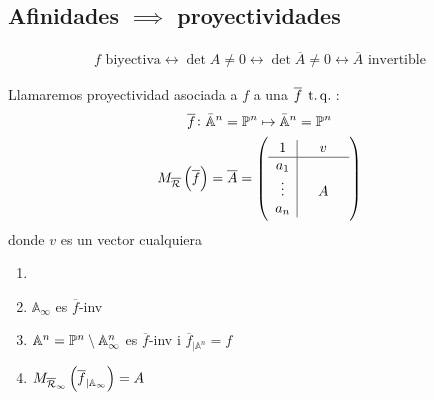\subsection{Afinidades $\implies$ proyectividades}
\begin{gather*}
f\text{ biyectiva} \leftrightarrow \det A \ne 0 \leftrightarrow \det \overline{A} \ne 0 \leftrightarrow \overline{A} \text{ invertible}
\end{gather*}
\begin{defi}
    Llamaremos proyectividad asociada a $f$ a una $\overline{f} \operatorname{\;t.q.\;}$:
    \begin{gather*}
        \overline{f} \colon \bar{\mathbb{A}}^n = \mathbb{P}^n \mapsto \bar{\mathbb{A}}^n = \mathbb{P}^n \\
        M_{\overline{\mathcal{R}}}\left( \overline{f}\right) = \overline{A} = 
        \left(
        \begin{array}{c|ccc}
            1 &  & v & \\ \hline
            a_1 & & & \\
            \vdots & & A & \\
            a_n & & & 
        \end{array} \right) \\ 
    \end{gather*}
    donde $v$ es un vector cualquiera
\end{defi}
\begin{prop}
    \begin{enumerate}
        \item[]
        \item $\mathbb{A}_\infty$ es $\overline{f}$-inv
        \item $\mathbb{A}^n = \mathbb{P}^n \setminus \mathbb{A}_\infty^n$ es $\overline{f}$-inv i $\overline{f}_{|\mathbb{A}^n}=f$
        \item $M_{\overline{\mathcal{R}}_\infty}\left( \overline{f}_{|\mathbb{A}_\infty} \right) = A$
    \end{enumerate}
\end{prop}
